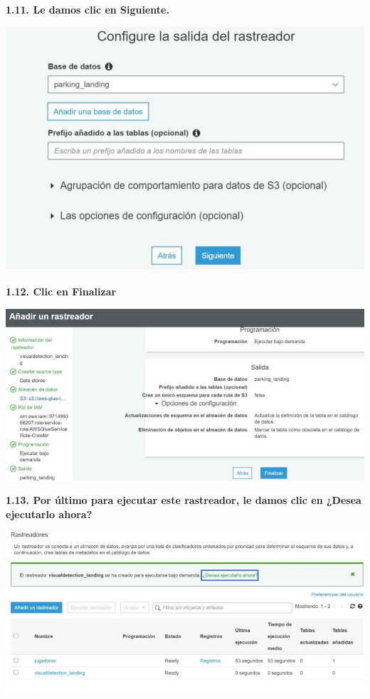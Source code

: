 \documentclass{article}
\begin{document}
	
		
	\newpage
\textbf{1.11. Le damos clic en Siguiente.
}

    \begin{center}
		\includegraphics[width=15cm]{./images/12} 
	\end{center}
	
	
	\textbf{1.12.  Clic en Finalizar
}

    \begin{center}
		\includegraphics[width=15cm]{./images/13} 
	\end{center}
	
	\textbf{1.13.  Por último para ejecutar este rastreador, le damos clic en ¿Desea ejecutarlo ahora?
}

    \begin{center}
		\includegraphics[width=15cm]{./images/14} 
	\end{center}
	
\end{document}
